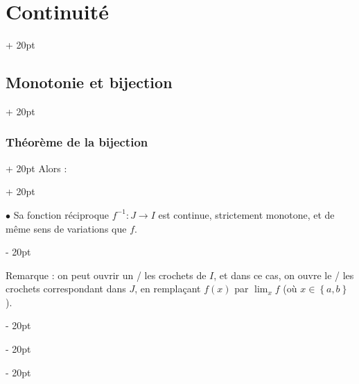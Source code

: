 \documentclass[a4paper, 12pt, twoside]{article}
\newcommand{\set}[1]{\left\{ #1 \right\}}
\newcommand{\ind}[1][20pt]{\advance\leftskip + #1}
\newcommand{\deind}[1][20pt]{\advance\leftskip - #1}
\newenvironment{indt}[2][20pt]{#2 \par \ind[#1]}{\par \deind} %
\begin{document}
\begin{indt}{\section{Continuité}}
\begin{indt}{\subsection{Monotonie et bijection}}
\begin{indt}{\subsubsection{Théorème de la bijection}}
\begin{indt}{Alors :}
                    \vspace{6pt}
                    
                    $\bullet$ Sa fonction réciproque $f^{-1} : J \longrightarrow I$ est continue, strictement monotone, et de même sens de variations que $f$.
                \end{indt}

                \vspace{12pt}
                
                Remarque : on peut ouvrir un / les crochets de $I$, et dans ce cas, on ouvre le / les crochets correspondant dans $J$, en remplaçant $f(x)$  par $\displaystyle \lim_x f$ (où $x \in \set{a, b}$).
            \end{indt}
        \end{indt}
        
    \end{indt}

    \vspace{12pt}
    
\end{document}
